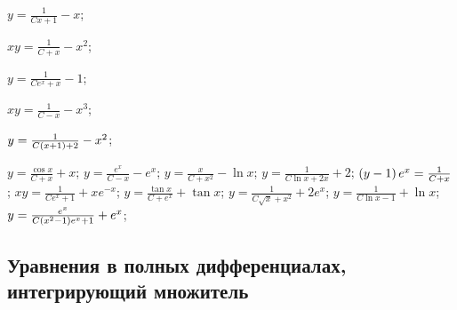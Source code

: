 \begin{enumsols}
		\label{firstorder:to_linear_riccati}
		\item \( y = \frac{1}{Cx + 1} - x \); \sfill %
		\item \( xy = \frac{1}{C + x} - x^2 \); \sfill %
		\item \( y = \frac{1}{C e^{x} + x} - 1 \); \sfill %
		\item \( xy = \frac{1}{C - x} - x^3 \); \sfill %
		\item \( y = \frac{1}{C \left( x + 1 \right) + 2} - x^2 \); \sfill %
		\item \( y = \frac{\cos{x}}{C + x} + x \); \sfill %
		\itemstar \( y = \frac{e^{x}}{C - x} - e^{x} \); \sfill %
		\itemstar \( y = \frac{x}{C + x^2} - \ln{x} \); \sfill %
		\itemstar \( y = \frac{1}{C \ln{x} + 2x} + 2 \); \sfill %
		\itemstar \( \left( y - 1 \right) e^{x} = \frac{1}{C + x} \); \sfill %
		\itemstar \( xy = \frac{1}{Ce^{x} + 1} + xe^{-x} \); \sfill %
		\itemstar \( y = \frac{\tan{x}}{C + e^{x}} + \tan{x} \); \sfill %
		\itemstar \( y = \frac{1}{C \sqrt{x} + x^2} + 2e^{x} \); \sfill %
		\itemstar \( y = \frac{1}{C \ln{x} - 1} + \ln{x} \); \sfill %
		\itemstar \( y = \frac{e^{x}}{C \left( x^2 - 1 \right)e^{x} + 1} + e^{x} \); \sfill %

	\end{enumsols}

\subsection*{Уравнения в полных дифференциалах, интегрирующий множитель}

